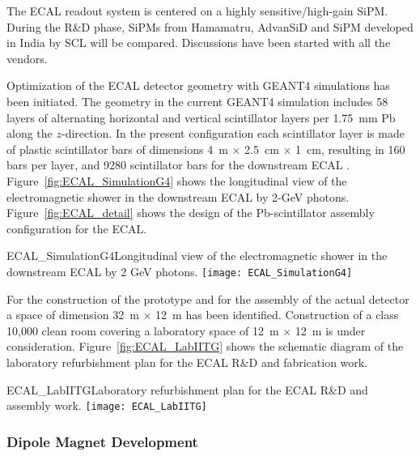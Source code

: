 The ECAL readout system is centered on a highly sensitive/high-gain
SiPM.  During the R\&D phase, SiPMs from Hamamatru, AdvanSiD and SiPM
developed in India by SCL will be compared.  Discussions have been
started with all the vendors.


Optimization of the ECAL detector geometry with GEANT4 simulations has
been initiated. The geometry in the current GEANT4 simulation includes
58 layers of alternating horizontal and vertical scintillator layers
per 1.75~mm Pb along the $z$-direction. In the present configuration
each scintillator layer is made of plastic scintillator bars of
dimensions 4~m $\times$ 2.5~cm $\times$ 1~cm, resulting in 160 bars per
layer, and \num{9280} scintillator bars for the downstream ECAL .
Figure~\ref{fig:ECAL_SimulationG4} shows the longitudinal view of the
electromagnetic shower in the downstream ECAL by 2-GeV
photons. Figure~\ref{fig:ECAL_detail} shows the design of the
Pb-scintillator assembly configuration for the ECAL.
\begin{cdrfigure}
{ECAL_SimulationG4}{Longitudinal view of the electromagnetic shower in
the downstream ECAL by 2 GeV photons.}
\texttt{[image: ECAL\_SimulationG4]}
\end{cdrfigure}

For the construction of the prototype and for the assembly of the
actual detector a space of dimension 32~m $\times$ 12~m has been
identified. Construction of a class 10,000 clean room covering a
laboratory space of 12~m $\times$ 12~m is under consideration.
Figure~\ref{fig:ECAL_LabIITG} shows the schematic diagram of the
laboratory refurbishment plan for the ECAL R\&D and fabrication work.
\begin{cdrfigure}
{ECAL_LabIITG}{Laboratory refurbishment plan for the ECAL R\&D and assembly work.}
\texttt{[image: ECAL\_LabIITG]}
\end{cdrfigure}


\subsubsection{Dipole Magnet Development}

